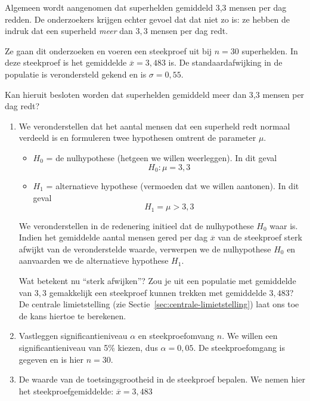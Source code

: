 \begin{example}
  \label{ex:hypothesetoets-dagelijkse-reddingen}
  Algemeen wordt aangenomen dat superhelden gemiddeld 3,3 mensen per dag redden. De onderzoekers krijgen echter gevoel dat dat niet zo is: ze hebben de indruk dat een superheld \emph{meer} dan $3,3$ mensen per dag redt.
  
  Ze gaan dit onderzoeken en voeren een steekproef uit bij $n = 30$ superhelden. In deze steekproef is het gemiddelde $\overline{x} = 3,483$ is. De standaardafwijking in de populatie is verondersteld gekend en is $\sigma = 0,55$.
  
  Kan hieruit besloten worden dat superhelden gemiddeld meer dan 3,3 mensen per dag redt?

  \begin{enumerate}
    \item We veronderstellen dat het aantal mensen dat een superheld redt normaal verdeeld  is en formuleren twee hypothesen omtrent de parameter $\mu$.
    \begin{itemize}
      \item $H_{0}$ = de nulhypothese (hetgeen we willen weerleggen). In dit geval \[ H_{0} : \mu = 3,3 \]
      \item $H_{1}$ = alternatieve hypothese (vermoeden dat we willen aantonen). In dit geval \[H_{1}= \mu > 3,3 \]
    \end{itemize}
  
    We veronderstellen in de redenering initieel dat de nulhypothese $H_{0}$ waar is. Indien het gemiddelde aantal mensen gered per dag $\overline{x}$ van de steekproef sterk afwijkt van de veronderstelde waarde, verwerpen we de nulhypothese $H_{0}$ en aanvaarden we de alternatieve hypothese $H_{1}$.
    
    Wat betekent nu ``sterk afwijken''? Zou je uit een populatie met gemiddelde van $3,3$ gemakkelijk een steekproef kunnen trekken met gemiddelde $3,483$? De centrale limietstelling (zie Sectie~\ref{sec:centrale-limietstelling}) laat ons toe de kans hiertoe te berekenen.
    
    \item Vastleggen significantieniveau $\alpha$ en steekproefomvang $n$. We willen een significantieniveau van 5\% kiezen, dus $\alpha = 0,05$. De steekproefomgang is gegeven en is hier $n = 30$.
    
    \item De waarde van de toetsingsgrootheid in de steekproef bepalen. We nemen hier het steekproefgemiddelde: $\overline{x} = 3,483$
    

\end{enumerate}
\end{example}
